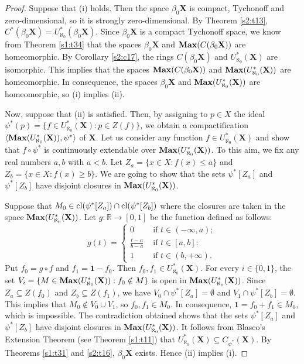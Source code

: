 \documentclass[12pt,twoside,leqno]{article}
\theoremstyle{plain}
\theoremstyle{definition}
\theoremstyle{remark}
\DeclareMathOperator{\cl}{{\rm cl}}
\DeclareMathOperator{\BMax}{\bf{Max}}
\begin{document}
\begin{proof}
	Suppose that (i) holds. Then the space $\beta_0\mathbf{X}$ is compact, Tychonoff and zero-dimensional, so it is strongly zero-dimensional. By Theorem \ref{s2:t13}, $C^{\ast}(\beta_0\mathbf{X})=U_{\aleph_0}^{\ast}(\beta_0\mathbf{X})$. Since $\beta_0\mathbf{X}$ is a compact Tychonoff space, we know from Theorem \ref{s1:t34} that the spaces $\beta_0\mathbf{X}$ and $\BMax(C(\beta_0\mathbf{X}))$ are homeomorphic. By Corollary \ref{s2:c17}, the rings $C(\beta_0\mathbf{X})$ and $U_{\aleph_0}^{\ast}(\mathbf{X})$ are isomorphic. This implies that the spaces $\BMax( C(\beta_0\mathbf{X}))$ and $\BMax(U_{\aleph_0}^{\ast}(\mathbf{X}))$ are homeomorphic. In consequence, the spaces $\beta_0\mathbf{X}$ and $\BMax(U_{\aleph_0}^{\ast}(\mathbf{X}))$ are homeomorphic, so (i) implies (ii). 
	
	Now, suppose that (ii) is satisfied. Then, by assigning to $p\in X$ the ideal $\psi^{\ast}(p)=\{f\in U_{\aleph_0}^{\ast}(\mathbf{X}): p\in Z(f)\}$, we obtain a compactification $\langle \BMax(U_{\aleph_0}^{\ast}(\mathbf{X})), \psi^{\ast}\rangle$ of $\mathbf{X}$. Let us consider any function $f\in U_{\aleph_0}^{\ast}(\mathbf{X})$ and show that $f\circ \psi^{\ast}$ is continuously extendable over $\BMax(U_{\aleph_0}^{\ast}(\mathbf{X}))$. To this aim, we fix any real numbers $a,b$ with $a<b$. Let $Z_a=\{x\in X: f(x)\leq a\}$ and $Z_b=\{x\in X: f(x)\geq b\}$. We are going to show that the sets $\psi^{\ast}[Z_a]$ and $\psi^{\ast}[Z_b]$ have disjoint closures in $\BMax(U_{\aleph_0}^{\ast}(\mathbf{X}))$. 
	
	Suppose that $M_0\in\cl(\psi^{\ast}[Z_a])\cap \cl(\psi^{\ast}[Z_b])$ where the closures are taken in the space $\BMax(U_{\aleph_0}^{\ast}(\mathbf{X}))$. Let $g:\mathbb{R}\to [0,  1]$ be the function defined as follows: 
	$$
	g(t)=\begin{cases} 0 &\text{ if } t\in (-\infty, a);\\
		\frac{t-a}{b-a} &\text{ if } t\in [a, b];\\
		1 &\text{ if } t\in (b, +\infty).
	\end{cases}
	$$
	Put $f_0=g\circ f$ and $f_1= \mathbf{1}-f_0$. Then $f_0, f_1\in U_{\aleph_0}^{\ast}(\mathbf{X})$. For every $i\in\{0, 1\}$, the set $V_i=\{M\in\BMax(U_{\aleph_0}^{\ast}(\mathbf{X})): f_0\notin M\}$ is open in $\BMax(U_{\aleph_0}^{\ast}(\mathbf{X}))$. Since $Z_a\subseteq Z(f_0)$ and $Z_b\subseteq Z(f_1)$, we have  $V_0\cap \psi^{\ast}[Z_a]=\emptyset$ and $V_1\cap\psi^{\ast}[Z_b]=\emptyset$. This implies that $M_0\notin V_0\cup V_1$, so $f_0, f_1\in M_0$. In consequence, $\mathbf{1}=f_0+f_1\in M_0$, which is impossible. The contradiction obtained shows that the sets $\psi^{\ast}[Z_a]$ and $\psi^{\ast}[Z_b]$ have disjoint closures in $\BMax(U_{\aleph_0}^{\ast}(\mathbf{X}))$. It follows from Blasco's Extension Theorem (see Theorem \ref{s1:t11}) that $U_{\aleph_0}^{\ast}(\mathbf{X})\subseteq C_{\psi^{\ast}}(\mathbf{X})$. By Theorems \ref{s1:t31} and \ref{s2:t16}, $\beta_0\mathbf{X}$ exists. Hence (ii) implies (i).
\end{proof}
\end{document}
